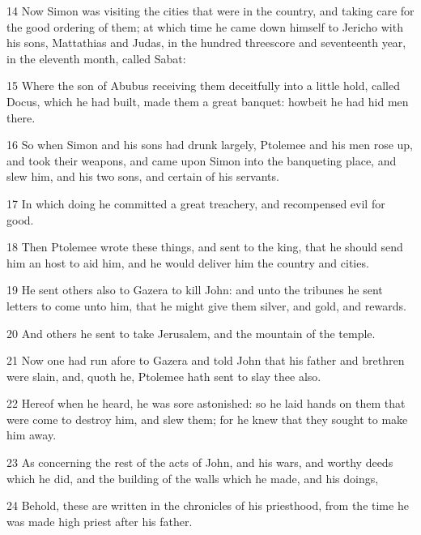 \par 14 Now Simon was visiting the cities that were in the country, and taking care for the good ordering of them; at which time he came down himself to Jericho with his sons, Mattathias and Judas, in the hundred threescore and seventeenth year, in the eleventh month, called Sabat:
\par 15 Where the son of Abubus receiving them deceitfully into a little hold, called Docus, which he had built, made them a great banquet: howbeit he had hid men there.
\par 16 So when Simon and his sons had drunk largely, Ptolemee and his men rose up, and took their weapons, and came upon Simon into the banqueting place, and slew him, and his two sons, and certain of his servants.
\par 17 In which doing he committed a great treachery, and recompensed evil for good.
\par 18 Then Ptolemee wrote these things, and sent to the king, that he should send him an host to aid him, and he would deliver him the country and cities.
\par 19 He sent others also to Gazera to kill John: and unto the tribunes he sent letters to come unto him, that he might give them silver, and gold, and rewards.
\par 20 And others he sent to take Jerusalem, and the mountain of the temple.
\par 21 Now one had run afore to Gazera and told John that his father and brethren were slain, and, quoth he, Ptolemee hath sent to slay thee also.
\par 22 Hereof when he heard, he was sore astonished: so he laid hands on them that were come to destroy him, and slew them; for he knew that they sought to make him away.
\par 23 As concerning the rest of the acts of John, and his wars, and worthy deeds which he did, and the building of the walls which he made, and his doings,
\par 24 Behold, these are written in the chronicles of his priesthood, from the time he was made high priest after his father.

